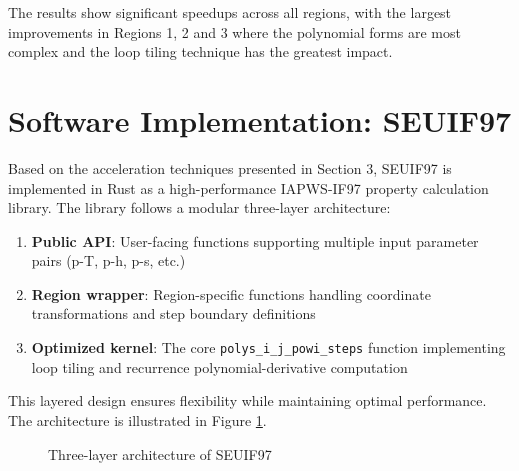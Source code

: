 \documentclass{article}
\begin{document}
The results show significant speedups across all regions, with the largest improvements in Regions 1, 2 and 3 where the polynomial forms are most complex and the loop tiling technique has the greatest impact.

\section{Software Implementation: SEUIF97}

Based on the acceleration techniques presented in Section 3, SEUIF97 is implemented in Rust as a high-performance IAPWS-IF97 property calculation library. The library follows a modular three-layer architecture:

\begin{enumerate}
    \item \textbf{Public API}: User-facing functions supporting multiple input parameter pairs (p-T, p-h, p-s, etc.)
    \item \textbf{Region wrapper}: Region-specific functions handling coordinate transformations and step boundary definitions
    \item \textbf{Optimized kernel}: The core \texttt{polys\_i\_j\_powi\_steps} function implementing loop tiling and recurrence polynomial-derivative computation
\end{enumerate}

This layered design ensures flexibility while maintaining optimal performance. The architecture is illustrated in Figure \ref{fig:architecture}.

\begin{figure}[H]
\centering
{}
\caption{Three-layer architecture of SEUIF97}
\label{fig:architecture}
\end{figure}
\end{document}
